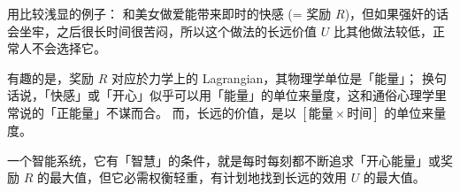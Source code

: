 \documentclass[orivec]{llncs}
\makeatletter
\newcommand{\emp}[1]{\textbf{\textcolor{Cerulean}{#1}}}
\newcommand{\vect}[1]{\boldsymbol{#1}}
\renewcommand{\boxed}[1]{\fbox{\m@th$\displaystyle\scalebox{0.9}{#1}$} \,}
\makeatother
\begin{document}
用比较浅显的例子： 和美女做爱能带来即时的快感 (= 奖励 $R$)，但如果强奸的话会坐牢，之后很长时间很苦闷，所以这个做法的长远价值 $U$ 比其他做法较低，正常人不会选择它。

有趣的是，奖励 $R$ 对应於力学上的 Lagrangian，其物理学单位是「能量」； 换句话说，「快感」或「开心」似乎可以用「能量」的单位来量度，这和通俗心理学里常说的「正能量」不谋而合。 而，长远的价值，是以 $[\mbox{能量} \times \mbox{时间}]$ 的单位来量度。

一个智能系统，它有「智慧」的条件，就是每时每刻都不断追求「开心能量」或奖励 $R$ 的最大值，但它必需权衡轻重，有计划地找到长远的效用 $U$ 的最大值。

\end{document}
